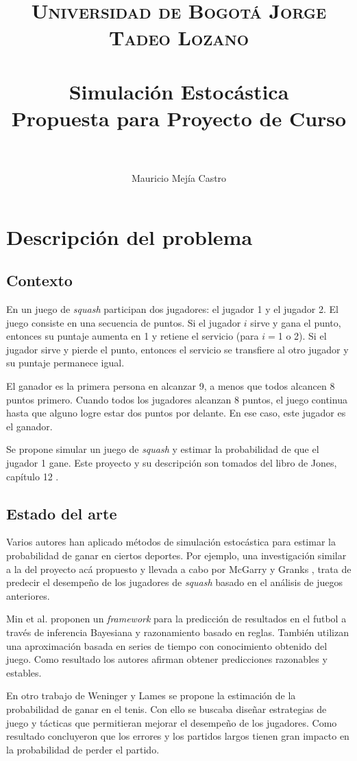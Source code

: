 \documentclass[11pt,letterpaper]{scrartcl}
\title{
	\usefont{OT1}{bch}{b}{n}
	\normalfont \normalsize \textsc{Universidad de Bogotá Jorge Tadeo Lozano} \\ [25pt]
	\horrule{0.5pt} \\[0.4cm]
	\huge Simulación Estocástica \\ Propuesta para Proyecto de Curso \\
	\horrule{2pt} \\[0.5cm]
}
\author{Mauricio Mejía Castro}
\begin{document}
	\maketitle
	\tableofcontents
	
	\section{Descripción del problema}
		\subsection{Contexto}
		En un juego de \textit{squash} participan dos jugadores: el jugador 1 y el jugador 2. El juego consiste en una secuencia de puntos. Si el jugador $i$ sirve y gana el punto, entonces su puntaje aumenta en 1 y retiene el servicio (para $i=$1 o 2). Si el jugador sirve y pierde el punto, entonces el servicio se transfiere al otro jugador y su puntaje permanece igual.
		
		El ganador es la primera persona en alcanzar 9, a menos que todos alcancen 8 puntos primero. Cuando todos los jugadores alcanzan 8 puntos, el juego continua hasta que alguno logre estar dos puntos por delante. En ese caso, este jugador es el ganador.
		
		Se propone simular un juego de \textit{squash} y estimar la probabilidad de que el jugador 1 gane. Este proyecto y su descripción son tomados del libro de Jones, capítulo 12 \cite{jones2009introduction}.
		
		\subsection{Estado del arte}
		Varios autores han aplicado métodos de simulación estocástica para estimar la probabilidad de ganar en ciertos deportes. Por ejemplo, una investigación similar a la del proyecto acá propuesto y llevada a cabo por McGarry y Granks \cite{mcgarry1994stochastic}, trata de predecir el desempeño de los jugadores de \textit{squash} basado en el análisis de juegos anteriores.
		
		Min et al. \cite{min2008compound} proponen un \textit{framework} para la predicción de resultados en el futbol a través de inferencia Bayesiana y razonamiento basado en reglas. También utilizan una aproximación basada en series de tiempo con conocimiento obtenido del juego. Como resultado los autores afirman obtener predicciones razonables y estables.
		
		En otro trabajo de Weninger y Lames \cite{wenninger2016performance} se propone la estimación de la probabilidad de ganar en  el tenis. Con ello se buscaba diseñar estrategias de juego y tácticas que permitieran mejorar el desempeño de los jugadores. Como resultado concluyeron que los errores y los partidos largos tienen gran impacto en la probabilidad de perder el partido.
		
\end{document}
